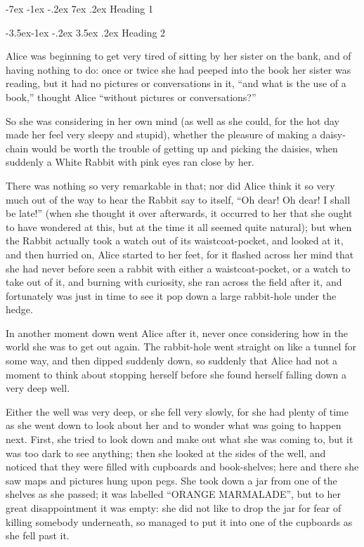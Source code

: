 \documentclass[
  12pt,
  twoside]{article}
\author{}
\date{\vspace{-2.5em}}
\makeatletter
\newcommand{\BIG}{\fontsize{36}{43}\selectfont}
\renewcommand\section{\@startsection {section}{1}{\z@}%
      {-7ex \@plus -1ex \@minus -.2ex}%
      {7ex \@plus.2ex}%
      {\newpage\vspace*{-0.2in}\normalfont\BIG\SS@sectfont}}
\renewcommand\subsection{\@startsection{subsection}{2}{\z@}%
      {-3.5ex\@plus -1ex \@minus -.2ex}%
      {3.5ex \@plus .2ex}%
      {\normalfont\LARGE\itshape\SS@subsectfont}}
\makeatother
\begin{document}
\section{Heading 1}\label{heading-1}

\subsection{Heading 2}\label{heading-2}

\begin{multicols}{3}

Alice was beginning to get very tired of sitting by her sister on the bank, and of having nothing to do: once or twice she had peeped into the book her sister was reading, but it had no pictures or conversations in it, “and what is the use of a book,” thought Alice “without pictures or conversations?”

So she was considering in her own mind (as well as she could, for the hot day made her feel very sleepy and stupid), whether the pleasure of making a daisy-chain would be worth the trouble of getting up and picking the daisies, when suddenly a White Rabbit with pink eyes ran close by her.

There was nothing so very remarkable in that; nor did Alice think it so very much out of the way to hear the Rabbit say to itself, “Oh dear! Oh dear! I shall be late!” (when she thought it over afterwards, it occurred to her that she ought to have wondered at this, but at the time it all seemed quite natural); but when the Rabbit actually took a watch out of its waistcoat-pocket, and looked at it, and then hurried on, Alice started to her feet, for it flashed across her mind that she had never before seen a rabbit with either a waistcoat-pocket, or a watch to take out of it, and burning with curiosity, she ran across the field after it, and fortunately was just in time to see it pop down a large rabbit-hole under the hedge.

In another moment down went Alice after it, never once considering how in the world she was to get out again. The rabbit-hole went straight on like a tunnel for some way, and then dipped suddenly down, so suddenly that Alice had not a moment to think about stopping herself before she found herself falling down a very deep well.

Either the well was very deep, or she fell very slowly, for she had plenty of time as she went down to look about her and to wonder what was going to happen next. First, she tried to look down and make out what she was coming to, but it was too dark to see anything; then she looked at the sides of the well, and noticed that they were filled with cupboards and book-shelves; here and there she saw maps and pictures hung upon pegs. She took down a jar from one of the shelves as she passed; it was labelled “ORANGE MARMALADE”, but to her great disappointment it was empty: she did not like to drop the jar for fear of killing somebody underneath, so managed to put it into one of the cupboards as she fell past it.


\end{multicols}
\end{document}
